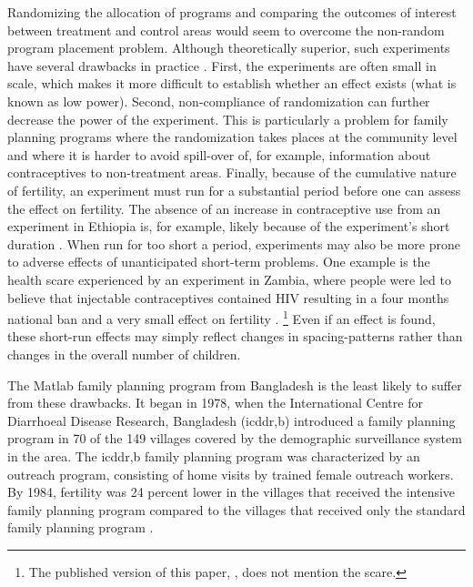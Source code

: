 \documentclass[letterpaper,12pt]{article}
\begin{document}
Randomizing the allocation of programs and comparing the outcomes of
interest between treatment and control areas would seem to overcome the
non-random program placement problem. 
Although theoretically superior, such experiments have several drawbacks
in practice \citep{Portner2011}. 
First, the experiments are often small in scale, which makes it more 
difficult to establish whether an effect exists (what is known as low
power).
Second, non-compliance of randomization can further decrease the
power of the experiment. 
This is particularly a problem for family planning programs where
the randomization takes places at the community level and where it
is harder to avoid spill-over of, for example, information about 
contraceptives to non-treatment areas. 
Finally, because of the cumulative nature of fertility, an experiment
must run for a substantial period before one can assess the effect on
fertility. 
The absence of an increase in contraceptive use from an experiment 
in Ethiopia is, for example, likely because of the experiment's 
short duration \citep{Desai2011}. 
When run for too short a period, experiments may also be more prone to
adverse effects of unanticipated short-term problems.
One example is the health scare experienced by an experiment
in Zambia, where people were led to believe that injectable
contraceptives contained HIV resulting in a four months national ban
and a very small effect on fertility \citep{Ashraf2009}.%
\footnote{
The published version of this paper, \citet{Ashraf2014}, does not 
mention the scare.}
Even if an effect is found, these short-run effects may simply reflect
changes in spacing-patterns rather than changes in the overall number of
children. 

The Matlab family planning program from Bangladesh is the least likely
to suffer from these drawbacks. 
It began in 1978, when the International Centre for Diarrhoeal Disease
Research, Bangladesh (icddr,b) introduced a family planning program in
70 of the 149 villages covered by the demographic surveillance system in
the area. 
The icddr,b family planning program was characterized by an outreach
program, consisting of home visits by trained female outreach workers. 
By 1984, fertility was 24 percent lower in the villages that received
the intensive family planning program compared to the villages that
received only the standard family planning program \citep{Phillips1988}.
\end{document}
